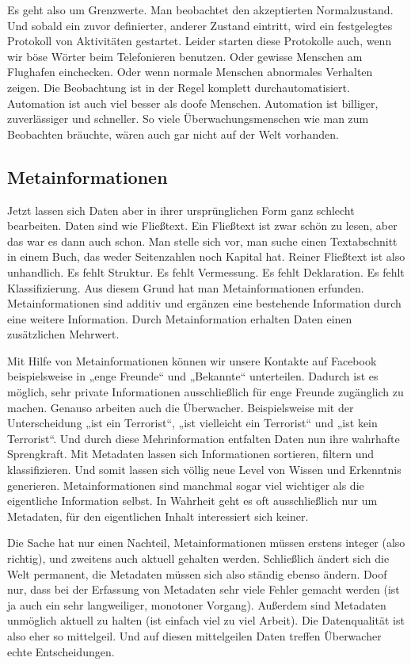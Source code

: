 	Es geht also um Grenzwerte. Man beobachtet den akzeptierten Normalzustand. Und sobald ein zuvor definierter, anderer Zustand eintritt, wird ein festgelegtes Protokoll von Aktivitäten gestartet. Leider starten diese Protokolle auch, wenn wir böse Wörter beim Telefonieren benutzen. Oder gewisse Menschen am Flughafen einchecken. Oder wenn normale Menschen abnormales Verhalten zeigen. Die Beobachtung ist in der Regel komplett durchautomatisiert. Automation ist auch viel besser als doofe Menschen. Automation ist billiger, zuverlässiger und schneller. So viele Überwachungsmenschen wie man zum Beobachten bräuchte, wären auch gar nicht auf der Welt vorhanden.
	
	\subsection{Metainformationen}
	Jetzt lassen sich Daten aber in ihrer ursprünglichen Form ganz schlecht bearbeiten. Daten sind wie Fließtext. Ein Fließtext ist zwar schön zu lesen, aber das war es dann auch schon. Man stelle sich vor, man suche einen Textabschnitt in einem Buch, das weder Seitenzahlen noch Kapital hat. Reiner Fließtext ist also unhandlich. Es fehlt Struktur. Es fehlt Vermessung. Es fehlt Deklaration. Es fehlt Klassifizierung. Aus diesem Grund hat man Metainformationen erfunden. Metainformationen sind additiv und ergänzen eine bestehende Information durch eine weitere Information. Durch Metainformation erhalten Daten einen zusätzlichen Mehrwert.
	
	Mit Hilfe von Metainformationen können wir unsere Kontakte auf Facebook beispielsweise in „enge Freunde“ und „Bekannte“ unterteilen. Dadurch ist es möglich, sehr private Informationen ausschließlich für enge Freunde zugänglich zu machen. Genauso arbeiten auch die Überwacher. Beispielsweise mit der Unterscheidung „ist ein Terrorist“, „ist vielleicht ein Terrorist“ und „ist kein Terrorist“. Und durch diese Mehrinformation entfalten Daten nun ihre wahrhafte Sprengkraft. Mit Metadaten lassen sich Informationen sortieren, filtern und klassifizieren. Und somit lassen sich völlig neue Level von Wissen und Erkenntnis generieren. Metainformationen sind manchmal sogar viel wichtiger als die eigentliche Information selbst. In Wahrheit geht es oft ausschließlich nur um Metadaten, für den eigentlichen Inhalt interessiert sich keiner.
	
	Die Sache hat nur einen Nachteil, Metainformationen müssen erstens integer (also richtig), und zweitens auch aktuell gehalten werden. Schließlich ändert sich die Welt permanent, die Metadaten müssen sich also ständig ebenso ändern. Doof nur, dass bei der Erfassung von Metadaten sehr viele Fehler gemacht werden (ist ja auch ein sehr langweiliger, monotoner Vorgang). Außerdem sind Metadaten unmöglich aktuell zu halten (ist einfach viel zu viel Arbeit). Die Datenqualität ist also eher so mittelgeil. Und auf diesen mittelgeilen Daten treffen Überwacher echte Entscheidungen.
	
